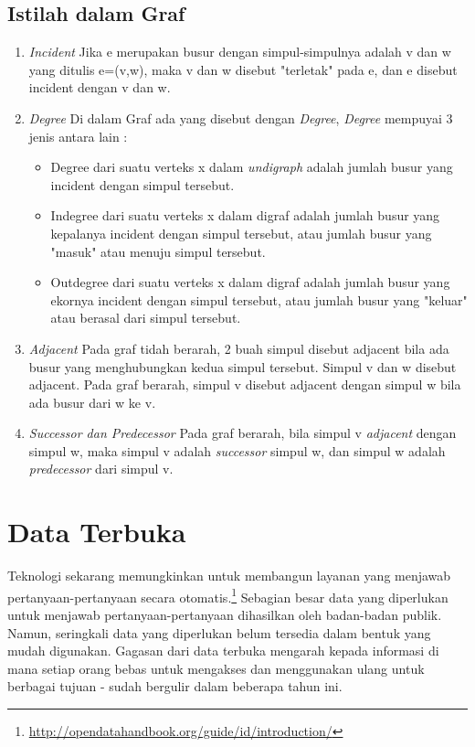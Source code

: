 \subsection{Istilah dalam Graf}
\label{sec: Istilah dalam Graf}
\begin{enumerate}
\item \textit{Incident}
Jika e merupakan busur dengan simpul-simpulnya adalah v dan w yang
ditulis e=(v,w), maka v dan w disebut "terletak" pada e, dan e disebut incident
dengan v dan w.
\item \textit{Degree}
Di dalam Graf ada yang disebut dengan \textit{Degree}, \textit{Degree} mempuyai 3 jenis antara lain :
\begin{itemize}
\item Degree dari suatu verteks x dalam \textit{undigraph} adalah jumlah busur yang
incident dengan simpul tersebut.
\item Indegree dari suatu verteks x dalam digraf adalah jumlah busur yang
kepalanya incident dengan simpul tersebut, atau jumlah busur yang "masuk" atau menuju simpul tersebut.
\item Outdegree dari suatu verteks x dalam digraf adalah jumlah busur yang
ekornya incident dengan simpul tersebut, atau jumlah busur yang "keluar"
atau berasal dari simpul tersebut.
\end{itemize}
\item \textit{Adjacent}
Pada graf tidah berarah, 2 buah simpul disebut adjacent bila ada busur yang
menghubungkan kedua simpul tersebut. Simpul v dan w disebut adjacent. 
Pada graf berarah, simpul v disebut adjacent dengan simpul w bila ada busur
dari w ke v.
\item \textit{Successor dan Predecessor}
Pada graf berarah, bila simpul v \textit{adjacent} dengan simpul w, maka simpul v adalah \textit{successor} simpul w, dan simpul w adalah \textit{predecessor} dari simpul v.
\end{enumerate}

\section{Data Terbuka}
\label{sec: Data Terbuka}
Teknologi sekarang memungkinkan untuk membangun layanan yang menjawab pertanyaan-pertanyaan secara otomatis.\footnote{\url{http://opendatahandbook.org/guide/id/introduction/}} Sebagian besar data yang diperlukan untuk menjawab pertanyaan-pertanyaan dihasilkan oleh badan-badan publik. Namun, seringkali data yang diperlukan belum tersedia dalam bentuk yang mudah digunakan. Gagasan dari data terbuka mengarah kepada informasi di mana setiap orang bebas untuk mengakses dan menggunakan ulang untuk berbagai tujuan - sudah bergulir dalam beberapa tahun ini.  	

